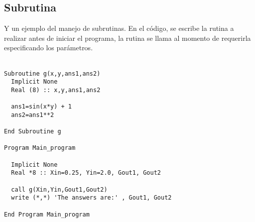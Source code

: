 \documentclass{article}
\begin{document}
\subsection*{Subrutina}
Y un ejemplo del manejo de subrutinas. En el c\'odigo, se escribe la rutina a realizar antes de iniciar el programa, la rutina se llama al momento de requerirla especificando los par\'ametros.\\ \\


	
\begin{Verbatim}[frame=single]
Subroutine g(x,y,ans1,ans2)
  Implicit None
  Real (8) :: x,y,ans1,ans2

  ans1=sin(x*y) + 1 
  ans2=ans1**2

End Subroutine g

Program Main_program

  Implicit None
  Real *8 :: Xin=0.25, Yin=2.0, Gout1, Gout2

  call g(Xin,Yin,Gout1,Gout2)
  write (*,*) 'The answers are:' , Gout1, Gout2

End Program Main_program
\end{Verbatim}
\end{document}

